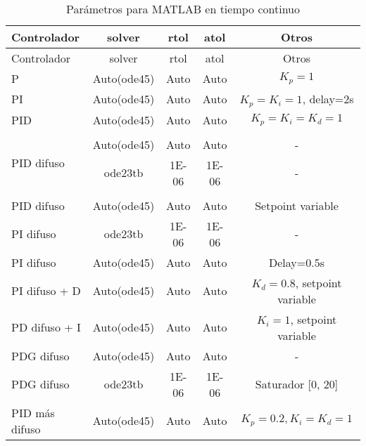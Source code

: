         {\setlength\LTleft{0pt}
        \setlength\LTright{0pt}
        \centering
        \footnotesize
        \renewcommand{\arraystretch}{0.89}
        \begin{longtable}{l @{\extracolsep{\fill}} cccc}
            \caption[Parámetros para MATLAB en tiempo continuo]{Parámetros para MATLAB en tiempo continuo} 
            \label{tab:parametrosMATLABc} \\
            \toprule
            Controlador  & solver & rtol & atol & Otros       \\ \midrule
            \endfirsthead
            \toprule
            Controlador  & solver & rtol & atol & Otros       \\ \midrule
            \endhead
            \bottomrule
            \endfoot
            P                           & Auto(ode45) &     Auto    &    Auto     & $K_p=1$                       \\
            PI                          & Auto(ode45) &     Auto    &    Auto     & $K_p=K_i=1$, delay=2s         \\
            PID                         & Auto(ode45) &     Auto    &    Auto     & $K_p=K_i=K_d=1$               \\
                                        &             &             &             &                               \\[-3pt]      
            \multirow{2}{*}{PID difuso} & Auto(ode45) &     Auto    &    Auto     & -                             \\
                                        & ode23tb     & \num{1E-06} & \num{1E-06} & -                             \\
                                        &             &             &             &                               \\[-3pt]
            PID difuso                  & Auto(ode45) &     Auto    &    Auto     & Setpoint variable             \\
            PI difuso                   & ode23tb     & \num{1E-06} & \num{1E-06} & -                             \\
            PI difuso                   & Auto(ode45) &     Auto    &    Auto     & Delay=0.5s                    \\
            PI difuso + D               & Auto(ode45) &     Auto    &    Auto     & $K_d=0.8$, setpoint variable  \\
            PD difuso + I               & Auto(ode45) &     Auto    &    Auto     & $K_i=1$, setpoint variable    \\
            PDG difuso                  & Auto(ode45) &     Auto    &    Auto     & -                             \\
            PDG difuso                  & ode23tb     & \num{1E-06} & \num{1E-06} & Saturador [0, 20]             \\
            PID más difuso              & Auto(ode45) &     Auto    &    Auto     & $K_p=0.2, K_i=K_d=1$          \\
        \end{longtable}}

